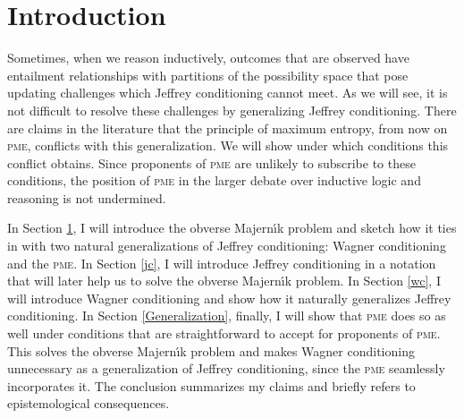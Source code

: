 \documentclass[entropy,article,submit,oneauthor,pdftex,12pt,a4paper]{mdpi}
\begin{document}




\section{Introduction}
\label{Introduction}

Sometimes, when we reason inductively, outcomes that are observed have
entailment relationships with partitions of the possibility space that
pose updating challenges which Jeffrey conditioning cannot meet. As we
will see, it is not difficult to resolve these challenges by
generalizing Jeffrey conditioning. There are claims in the literature
that the principle of maximum entropy, from now on \textsc{pme},
conflicts with this generalization. We will show under which
conditions this conflict obtains. Since proponents of
\textsc{pme} are unlikely to subscribe to these conditions, the
position of \textsc{pme} in the larger debate over inductive logic
and reasoning is not undermined.

In Section \ref{Introduction}, I will introduce the obverse
Majern{\'\i}k problem and sketch how it ties in with two natural
generalizations of Jeffrey conditioning: Wagner conditioning and the
\textsc{pme}. In Section \ref{jc}, I will introduce Jeffrey
conditioning in a notation that will later help us to solve the
obverse Majern{\'\i}k problem. In Section \ref{wc}, I will introduce
Wagner conditioning and show how it naturally generalizes Jeffrey
conditioning. In Section \ref{Generalization}, finally, I will show
that \textsc{pme} does so as well under conditions that are
straightforward to accept for proponents of \textsc{pme}. This
solves the obverse Majern{\'\i}k problem and makes Wagner conditioning
unnecessary as a generalization of Jeffrey conditioning, since the
\textsc{pme} seamlessly incorporates it. The conclusion summarizes my
claims and briefly refers to epistemological consequences.
\end{document}
